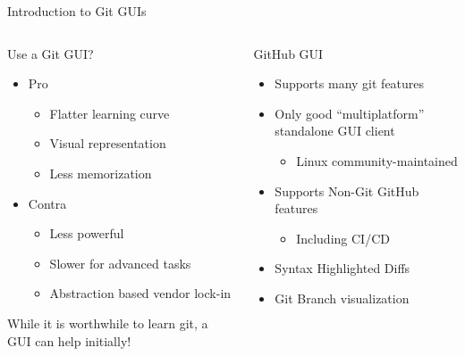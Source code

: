 \documentclass[compress,aspectratio=169]{beamer}
\begin{document}
	\begin{frame}{Introduction to Git GUIs}
    \begin{columns}
      \begin{column}{0.5\textwidth}
        \begin{block}{Use a Git GUI?}
          \begin{itemize}
            \item Pro
              \begin{itemize}
                \item Flatter learning curve
                \item Visual representation
                \item Less memorization
              \end{itemize}
            \item Contra
              \begin{itemize}
                \item Less powerful
                \item Slower for advanced tasks
                \item Abstraction based vendor lock-in
              \end{itemize}
          \end{itemize}
          \begin{center}
            While it is worthwhile to learn git, a GUI can help initially!
          \end{center}
        \end{block}
      \end{column}
      \begin{column}{0.5\textwidth}
        \begin{block}{GitHub GUI}
          \begin{itemize}
            \item Supports many git features
            \item Only good ``multiplatform'' standalone GUI client
              \begin{itemize}
                \item Linux community-maintained
              \end{itemize}
            \item Supports Non-Git GitHub features
              \begin{itemize}
                \item Including CI/CD
              \end{itemize}
            \item Syntax Highlighted Diffs
            \item Git Branch visualization
          \end{itemize}
        \end{block}
      \end{column}
    \end{columns}
	\end{frame}
\end{document}

